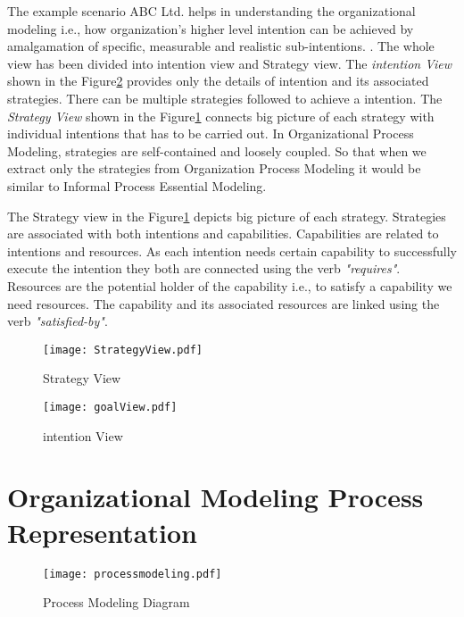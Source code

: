 \hspace{4ex} The example scenario ABC Ltd. helps in understanding the organizational modeling i.e., how organization's higher level intention can be achieved by amalgamation of specific, measurable and realistic sub-intentions. . The whole view has been divided into intention view and Strategy view. The \textit{intention View} shown in the Figure\ref{fig:intentionview} provides only the details of intention and its associated strategies. There can be multiple strategies followed to achieve a intention. The \textit{Strategy View} shown in the Figure\ref{fig:strategyview} connects big picture of each strategy with individual intentions that has to be carried out. In Organizational Process Modeling, strategies are self-contained and loosely coupled. So that when we extract only the strategies from Organization Process Modeling it would be similar to Informal Process Essential Modeling. 

\hspace{4ex} The Strategy view  in the Figure\ref{fig:strategyview} depicts big picture of each strategy. Strategies are associated with both intentions and capabilities. Capabilities are related to intentions and resources. As each intention needs certain capability to successfully execute the intention they both are connected using the verb \textit{"requires"}. Resources are the potential holder of the capability i.e., to satisfy a capability we need resources. The capability and its associated resources are linked using the verb \textit{"satisfied-by"}. 


\begin{figure}
	\centering
	\texttt{[image: StrategyView.pdf]}
	\caption{Strategy View}
	\label{fig:strategyview}
\end{figure}

\begin{figure}
	\centering
	\texttt{[image: goalView.pdf]}
	\caption{intention View}
	\label{fig:intentionview}
\end{figure}

\section{Organizational Modeling Process Representation}
\label{sec:orgmodelprocessrepresentation}
\begin{figure}
	\centering
	\texttt{[image: processmodeling.pdf]}
	\caption{Process Modeling Diagram}
	\label{fig:processdiagram}
\end{figure}


